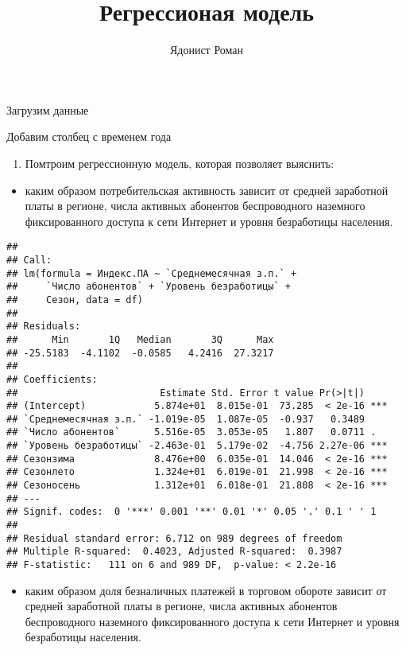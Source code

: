\documentclass[
]{article}
\title{Регрессионая модель}
\author{Ядонист Роман}
\date{}
\providecommand{\tightlist}{%
  \setlength{\itemsep}{0pt}\setlength{\parskip}{0pt}}
\begin{document}
\maketitle

Загрузим данные

Добавим столбец с временем года

\begin{enumerate}
\def\labelenumi{\arabic{enumi}.}
\tightlist
\item
  Помтроим регрессионную модель, которая позволяет выяснить:
\end{enumerate}

\begin{itemize}
\tightlist
\item
  каким образом потребительская активность зависит от средней заработной
  платы в регионе, числа активных абонентов беспроводного наземного
  фиксированного доступа к сети Интернет и уровня безработицы населения.
\end{itemize}

\begin{verbatim}
## 
## Call:
## lm(formula = Индекс.ПА ~ `Среднемесячная з.п.` + 
##     `Число абонентов` + `Уровень безработицы` + 
##     Сезон, data = df)
## 
## Residuals:
##      Min       1Q   Median       3Q      Max 
## -25.5183  -4.1102  -0.0585   4.2416  27.3217 
## 
## Coefficients:
##                         Estimate Std. Error t value Pr(>|t|)    
## (Intercept)            5.874e+01  8.015e-01  73.285  < 2e-16 ***
## `Среднемесячная з.п.` -1.019e-05  1.087e-05  -0.937   0.3489    
## `Число абонентов`      5.516e-05  3.053e-05   1.807   0.0711 .  
## `Уровень безработицы` -2.463e-01  5.179e-02  -4.756 2.27e-06 ***
## Сезонзима              8.476e+00  6.035e-01  14.046  < 2e-16 ***
## Сезонлето              1.324e+01  6.019e-01  21.998  < 2e-16 ***
## Сезоносень             1.312e+01  6.018e-01  21.808  < 2e-16 ***
## ---
## Signif. codes:  0 '***' 0.001 '**' 0.01 '*' 0.05 '.' 0.1 ' ' 1
## 
## Residual standard error: 6.712 on 989 degrees of freedom
## Multiple R-squared:  0.4023, Adjusted R-squared:  0.3987 
## F-statistic:   111 on 6 and 989 DF,  p-value: < 2.2e-16
\end{verbatim}

\begin{itemize}
\tightlist
\item
  каким образом доля безналичных платежей в торговом обороте зависит от
  средней заработной платы в регионе, числа активных абонентов
  беспроводного наземного фиксированного доступа к сети Интернет и
  уровня безработицы населения.
\end{itemize}
\end{document}
